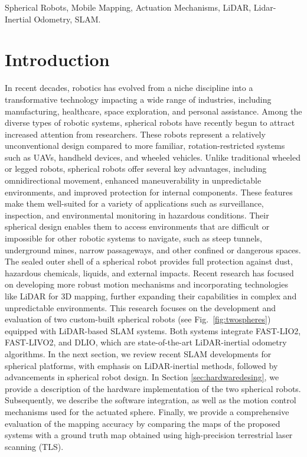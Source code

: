 \documentclass[a4paper, conference]{IEEEtran}
\begin{document}
\begin{IEEEkeywords}
Spherical Robots, Mobile Mapping, Actuation Mechanisms, LiDAR, Lidar-Inertial Odometry, SLAM.
\end{IEEEkeywords}

\section{Introduction}
In recent decades, robotics has evolved from a niche discipline into a transformative technology impacting a wide range of industries, including manufacturing, healthcare, space exploration, and personal assistance. 
Among the diverse types of robotic systems, spherical robots have recently begun to attract increased attention from researchers. These robots represent a relatively unconventional design compared to more familiar, rotation-restricted systems such as UAVs, handheld devices, and wheeled vehicles. 
Unlike traditional wheeled or legged robots, spherical robots offer several key advantages, including omnidirectional movement, enhanced maneuverability in unpredictable environments, and improved protection for internal components. 
These features make them well-suited for a variety of applications such as surveillance, inspection, and environmental monitoring in hazardous conditions. 
Their spherical design enables them to access environments that are difficult or impossible for other robotic systems to navigate, such as steep tunnels, underground mines, narrow passageways, and other confined or dangerous spaces.
The sealed outer shell of a spherical robot provides full protection against dust, hazardous chemicals, liquids, and external impacts. 
Recent research has focused on developing more robust motion mechanisms \cite{roboball,novelsphere,pendulum_sphere} and incorporating technologies like LiDAR for 3D mapping, further expanding their capabilities in complex and unpredictable environments\cite{Kalman_filter_sphere,DAEDALUS,sphere_Fabi_1}.
This research focuses on the development and evaluation of two custom-built spherical robots (see Fig.~\ref{fig:twospheres}) equipped with LiDAR-based SLAM systems. 
Both systems integrate FAST-LIO2\cite{fastlio2}, FAST-LIVO2\cite{fastlivo2}, and DLIO\cite{dlio}, which are state-of-the-art LiDAR-inertial odometry algorithms.
In the next section, we review recent SLAM developments for spherical platforms, with emphasis on LiDAR-inertial methods, followed by advancements in spherical robot design.
In Section \ref{sec:hardwaredesing}, we provide a description of the hardware implementation of the two spherical robots. 
Subsequently, we describe the software integration, as well as the motion control mechanisms used for the actuated sphere. 
Finally, we provide a comprehensive evaluation of the mapping accuracy by comparing the maps of the proposed systems with a ground truth map obtained using high-precision terrestrial laser scanning (TLS). 
\end{document}

